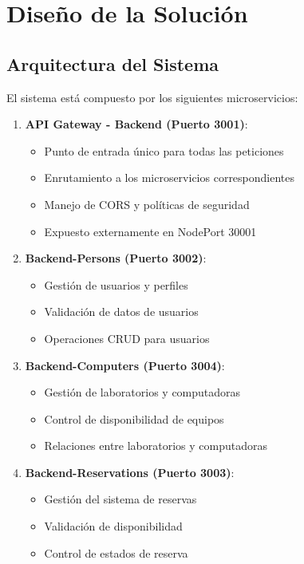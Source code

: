 \documentclass[12pt,a4paper]{article}
\begin{document}
\section{Diseño de la Solución}

\subsection{Arquitectura del Sistema}

El sistema está compuesto por los siguientes microservicios:

\begin{enumerate}
    \item \textbf{API Gateway - Backend (Puerto 3001)}:
    \begin{itemize}
        \item Punto de entrada único para todas las peticiones
        \item Enrutamiento a los microservicios correspondientes
        \item Manejo de CORS y políticas de seguridad
        \item Expuesto externamente en NodePort 30001
    \end{itemize}
    
    \item \textbf{Backend-Persons (Puerto 3002)}:
    \begin{itemize}
        \item Gestión de usuarios y perfiles
        \item Validación de datos de usuarios
        \item Operaciones CRUD para usuarios
    \end{itemize}
    
    \item \textbf{Backend-Computers (Puerto 3004)}:
    \begin{itemize}
        \item Gestión de laboratorios y computadoras
        \item Control de disponibilidad de equipos
        \item Relaciones entre laboratorios y computadoras
    \end{itemize}
    
    \item \textbf{Backend-Reservations (Puerto 3003)}:
    \begin{itemize}
        \item Gestión del sistema de reservas
        \item Validación de disponibilidad
        \item Control de estados de reserva
    \end{itemize}
\end{enumerate}
\end{document}
